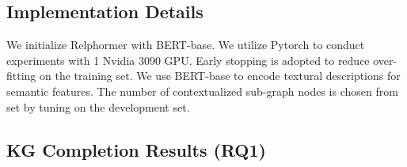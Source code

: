 \documentclass[sigconf]{acmart}
\begin{document}
\begin{table}[htbp!]
        \centering
    

\end{table} 

\subsection{Implementation Details}
\label{appendix:implementation_details}

We initialize Relphormer with BERT-base.
We utilize Pytorch to conduct experiments with 1 Nvidia 3090 GPU. 
Early stopping is adopted to reduce over-fitting on the training set.
We use BERT-base to encode textural descriptions for semantic  features.
The number of contextualized sub-graph nodes is chosen from set  by tuning on the development set. 
 




\subsection{KG Completion Results (RQ1)}
\end{document}
